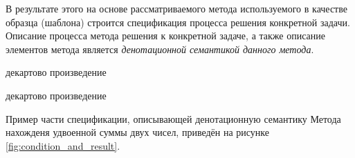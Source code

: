 В результате этого на основе рассматриваемого метода используемого в качестве образца (шаблона) строится спецификация процесса решения конкретной задачи. Описание процесса  метода решения к конкретной задаче, а также описание элементов метода является \textit{денотационной семантикой данного метода}.

\begin{SCn}
\begin{scnindent}
\end{scnindent}
\begin{scnindent}
    \begin{scnreltovector}{декартово произведение}
    \end{scnreltovector}
\end{scnindent}
\begin{scnindent}
    \begin{scnreltovector}{декартово произведение}
    \end{scnreltovector}
\end{scnindent}
\end{SCn}

Пример части спецификации, описывающей денотационную семантику Метода нахожденя удвоенной суммы двух чисел, приведён на рисунке \ref{fig:condition_and_result}.

